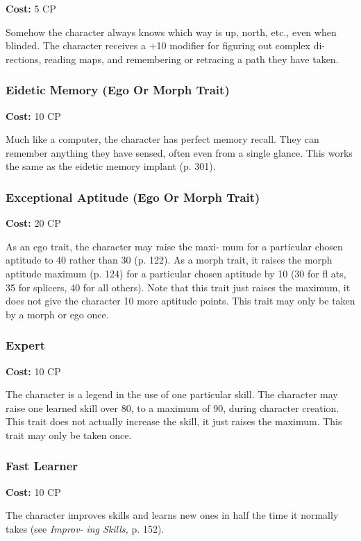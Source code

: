 \textbf{Cost:} 5 CP

Somehow the character always knows which way 
is up, north, etc., even when blinded. The character 
receives a +10 modifier for figuring out complex di-
rections, reading maps, and remembering or retracing 
a path they have taken.

\subsubsection{Eidetic Memory (Ego Or Morph Trait)}

\textbf{Cost:} 10 CP

Much like a computer, the character has perfect 
memory recall. They can remember anything they have 
sensed, often even from a single glance. This works the 
same as the eidetic memory implant (p. 301).

\subsubsection{Exceptional Aptitude (Ego Or Morph Trait)}

\textbf{Cost:} 20 CP

As an ego trait, the character may raise the maxi-
mum for a particular chosen aptitude to 40 rather 
than 30 (p. 122). As a morph trait, it raises the morph 
aptitude maximum (p. 124) for a particular chosen 
aptitude by 10 (30 for fl ats, 35 for splicers, 40 for all 
others). Note that this trait just raises the maximum, 
it does not give the character 10 more aptitude points. 
This trait may only be taken by a morph or ego once.

\subsubsection{Expert}

\textbf{Cost:} 10 CP

The character is a legend in the use of one particular 
skill. The character may raise one learned skill over 80, 
to a maximum of 90, during character creation. This 
trait does not actually increase the skill, it just raises 
the maximum. This trait may only be taken once.

\subsubsection{Fast Learner}

\textbf{Cost:} 10 CP

The character improves skills and learns new 
ones in half the time it normally takes (see \textit{Improv-}
\textit{ing Skills, }p. 152).

